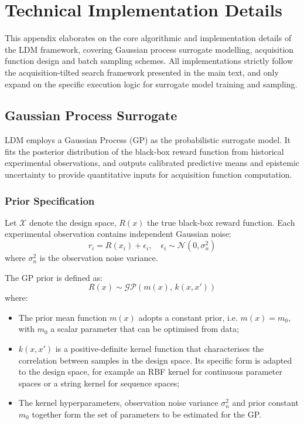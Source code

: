 \section{Technical Implementation Details}
\label{sec:impl-details}

This appendix elaborates on the core algorithmic and implementation details of the LDM framework, covering Gaussian process surrogate modelling, acquisition function design and batch sampling schemes. All implementations strictly follow the acquisition-tilted search framework presented in the main text, and only expand on the specific execution logic for surrogate model training and sampling.

\subsection{Gaussian Process Surrogate}
\label{sec:llm-bo}

LDM employs a Gaussian Process (GP) as the probabilistic surrogate model. It fits the posterior distribution of the black-box reward function from historical experimental observations, and outputs calibrated predictive means and epistemic uncertainty to provide quantitative inputs for acquisition function computation.

\subsubsection{Prior Specification}
Let $\mathcal{X}$ denote the design space, $R(x)$ the true black-box reward function. Each experimental observation contains independent Gaussian noise:
\[
r_i = R(x_i) + \epsilon_i,\quad \epsilon_i \sim \mathcal{N}(0, \sigma_n^2)
\]
where $\sigma_n^2$ is the observation noise variance.

The GP prior is defined as:
\[
R(x) \sim \mathcal{GP}\left(m(x),\, k(x, x')\right)
\]
where:
\begin{itemize}
  \item The prior mean function $m(x)$ adopts a constant prior, i.e. $m(x) = m_0$, with $m_0$ a scalar parameter that can be optimised from data;
  \item $k(x, x')$ is a positive-definite kernel function that characterises the correlation between samples in the design space. Its specific form is adapted to the design space, for example an RBF kernel for continuous parameter spaces or a string kernel for sequence spaces;
  \item The kernel hyperparameters, observation noise variance $\sigma_n^2$ and prior constant $m_0$ together form the set of parameters to be estimated for the GP.
\end{itemize}


